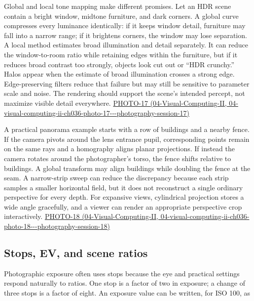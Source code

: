 Global and local tone mapping make different promises. Let an HDR scene contain a bright window, midtone furniture, and dark corners. A global curve compresses every luminance identically: if it keeps window detail, furniture may fall into a narrow range; if it brightens corners, the window may lose separation. A local method estimates broad illumination and detail separately. It can reduce the window-to-room ratio while retaining edges within the furniture, but if it reduces broad contrast too strongly, objects look cut out or ``HDR crunchy.'' Halos appear when the estimate of broad illumination crosses a strong edge. Edge-preserving filters reduce that failure but may still be sensitive to parameter scale and noise. The rendering should support the scene's intended percept, not maximize visible detail everywhere. \href{../04-Visual-Computing-II/main.pdf\#nameddest=04-visual-computing-ii-ch036-photo-17---photography-session-17}{PHOTO-17 (04-Visual-Computing-II, 04-visual-computing-ii-ch036-photo-17-\/-\/-photography-session-17)}

A practical panorama example starts with a row of buildings and a nearby fence. If the camera pivots around the lens entrance pupil, corresponding points remain on the same rays and a homography aligns planar projections. If instead the camera rotates around the photographer's torso, the fence shifts relative to buildings. A global transform may align buildings while doubling the fence at the seam. A narrow-strip sweep can reduce the discrepancy because each strip samples a smaller horizontal field, but it does not reconstruct a single ordinary perspective for every depth. For expansive views, cylindrical projection stores a wide angle gracefully, and a viewer can render an appropriate perspective crop interactively. \href{../04-Visual-Computing-II/main.pdf\#nameddest=04-visual-computing-ii-ch036-photo-18---photography-session-18}{PHOTO-18 (04-Visual-Computing-II, 04-visual-computing-ii-ch036-photo-18-\/-\/-photography-session-18)}

\subsection{Stops, EV, and scene ratios}\label{03-visual-computing-i-ch003-stops-ev-and-scene-ratios}

Photographic exposure often uses stops because the eye and practical settings respond naturally to ratios. One stop is a factor of two in exposure; a change of three stops is a factor of eight. An exposure value can be written, for ISO 100, as

